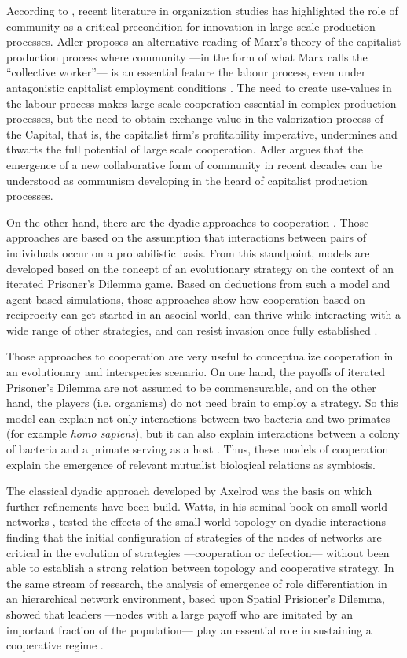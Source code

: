 According to \citet{adler:2015}, recent literature in organization studies \citep{omahony:2011} has highlighted the role of community \citep{tonnies:1974} as a critical precondition for innovation in large scale production processes. Adler proposes an alternative reading of Marx's theory of the capitalist production process where community ---in the form of what Marx calls the ``collective worker''--- is an essential feature the labour process, even under antagonistic capitalist employment conditions \citep[446]{adler:2015}. The need to create use-values in the labour process makes large scale cooperation essential in complex production processes, but the need to obtain exchange-value in the valorization process of the Capital, that is, the capitalist firm's profitability imperative, undermines and thwarts the full potential of large scale cooperation. Adler argues that the emergence of a new collaborative form of community in recent decades can be understood as communism developing in the heard of capitalist production processes.

On the other hand, there are the dyadic approaches to cooperation \citep{axelrod1981,axelrod:1997}. Those approaches are based on the assumption that interactions between pairs of individuals occur on a probabilistic basis. From this standpoint, models are developed based on the concept of an evolutionary strategy on the context of an iterated Prisoner's Dilemma game. Based on deductions from such a model and agent-based simulations, those approaches show how cooperation based on reciprocity can get started in an asocial world, can thrive while interacting with a wide range of other strategies, and can resist invasion once fully established \citep{axelrod1981}.

Those approaches to cooperation are very useful to conceptualize cooperation in an evolutionary and interspecies scenario. On one hand, the payoffs of iterated Prisoner's Dilemma are not assumed to be commensurable, and on the other hand, the players (i.e. organisms) do not need brain to employ a strategy. So this model can explain not only interactions between two bacteria and two primates (for example \emph{homo sapiens}), but it can also explain interactions between a colony of bacteria and a primate serving as a host \citep[211]{axelrod1981}. Thus, these models of cooperation explain the emergence of relevant mutualist biological relations as symbiosis.

The classical dyadic approach developed by Axelrod was the basis on which further refinements have been build. Watts, in his seminal book on small world networks \citep{watts:1999}, tested the effects of the small world topology on dyadic interactions finding that the initial configuration of strategies of the nodes of networks are critical in the evolution of strategies ---cooperation or defection--- without been able to establish a strong relation between topology and cooperative strategy. In the same stream of research, the analysis of emergence of role differentiation in an hierarchical network environment, based upon Spatial Prisioner's Dilemma, showed that leaders ---nodes with a large payoff who are imitated by an important fraction of the population--- play an essential role in sustaining a cooperative regime \citep*{eguiluz:2005}.

